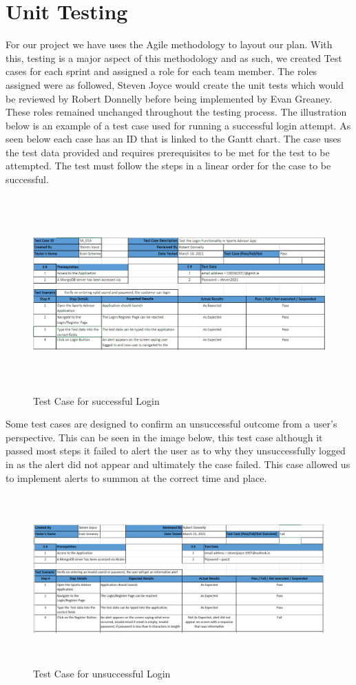 \section{Unit Testing}
For our project we have uses the Agile methodology to layout our plan. With this, testing is a major aspect of this methodology and as such, we created Test cases for each sprint and assigned a role for each team member. The roles assigned were as followed, Steven Joyce would create the unit tests which would be reviewed by Robert Donnelly before being implemented by Evan Greaney. These roles remained unchanged throughout the testing process.
\newline
\newline
The illustration below is an example of a test case used for running a successful login attempt. As seen below each case has an ID that is linked to the Gantt chart. The case uses the test data provided and requires prerequisites to be met for the test to be attempted. The test must follow the steps in a linear order for the case to be successful.
\begin{figure}[H]
    \centering
    \includegraphics[width=15cm, height = 7.5cm]{img/TestCasePass.PNG}
    \caption{Test Case for successful Login}
    \label{fig:altas config}
\end{figure}
Some test cases are designed to confirm an unsuccessful outcome from a user's perspective. This can be seen in the image below, this test case although it passed most steps it failed to alert the user as to why they unsuccessfully logged in as the alert did not appear and ultimately the case failed. This case allowed us to implement alerts to summon at the correct time and place.
\begin{figure}[H]
    \centering
    \includegraphics[width=15cm, height = 6.5cm]{img/TestCaseFail.PNG}
    \caption{Test Case for unsuccessful Login}
    \label{fig:altas config}
\end{figure}

